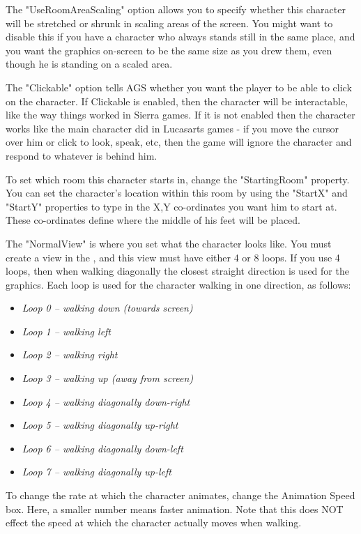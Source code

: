 The "UseRoomAreaScaling" option allows you to specify whether this
character will be stretched or shrunk in scaling areas of the screen. You might
want to disable this if you have a character who always stands still in the same
place, and you want the graphics on-screen to be the same size as you drew
them, even though he is standing on a scaled area.

The "Clickable" option tells AGS whether you want the player to be able
to click on the character. If Clickable is enabled, then the character will
be interactable, like the way things worked in Sierra games. If it is not
enabled then the character works like the main character did in Lucasarts games -
if you move the cursor over him or click to look, speak, etc, then the game will
ignore the character and respond to whatever is behind him.

To set which room this character starts in, change the "StartingRoom"
property. You can set the character's location within this room by using
the "StartX" and "StartY" properties to type in the X,Y co-ordinates you want him
to start at. These co-ordinates define where the middle of his feet will be placed.

The "NormalView" is where you set what the character looks like. You must
create a view in the , and this
view must have either 4 or 8 loops. If you use 4 loops, then when walking
diagonally the closest straight direction is used for the graphics. Each loop
is used for the character walking in one direction, as follows:
\begin{itemize}
\item \it{Loop 0} -- walking down (towards screen)
\item \it{Loop 1} -- walking left
\item \it{Loop 2} -- walking right
\item \it{Loop 3} -- walking up (away from screen)
\item \it{Loop 4} -- walking diagonally down-right
\item \it{Loop 5} -- walking diagonally up-right
\item \it{Loop 6} -- walking diagonally down-left
\item \it{Loop 7} -- walking diagonally up-left
\end{itemize}
To change the rate at which the character animates, change the Animation Speed box.
Here, a smaller number means faster animation. Note that this does NOT
effect the speed at which the character actually moves when walking.

